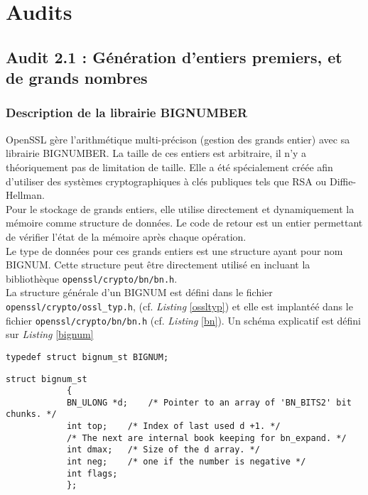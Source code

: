 \section{Audits}

	\subsection{Audit 2.1 : Génération d'entiers premiers, et de grands nombres}

		\subsubsection{Description de la librairie BIGNUMBER}

			OpenSSL gère l'arithmétique multi-précison (gestion des grands entier) avec sa librairie BIGNUMBER. La taille de ces entiers est arbitraire, il n'y a théoriquement pas de limitation de taille. Elle a été spécialement créée afin d'utiliser des systèmes cryptographiques à clés publiques tels que RSA ou Diffie-Hellman.\\

			Pour le stockage de grands entiers, elle utilise directement et dynamiquement la mémoire comme structure de données. Le code de retour est un entier permettant de vérifier l'état de la mémoire après chaque opération.\\

			Le type de données pour ces grands entiers est une structure ayant pour nom BIGNUM. Cette structure peut être directement utilisé en incluant la bibliothèque \texttt{openssl/crypto/bn/bn.h}.\\

			La structure générale d'un BIGNUM est défini dans le fichier \texttt{openssl/crypto/ossl\_typ.h}, (cf. \textit{Listing} \ref{ossltyp}) et elle est implantéé dans le fichier \texttt{openssl/crypto/bn/bn.h} (cf. \textit{Listing} \ref{bn}). Un schéma explicatif est défini sur \textit{Listing} \ref{bignum}

			\begin{lstlisting}[style=customc,caption=ossl\_typ.h, label=ossltyp]
			typedef struct bignum_st BIGNUM;
			\end{lstlisting}

			\begin{lstlisting}[style=customc,caption=bn.h, label=bn]
			struct bignum_st
			{
			BN_ULONG *d;	/* Pointer to an array of 'BN_BITS2' bit chunks. */
			int top;	/* Index of last used d +1. */
			/* The next are internal book keeping for bn_expand. */
			int dmax;	/* Size of the d array. */
			int neg;	/* one if the number is negative */
			int flags;
			};
			\end{lstlisting}

